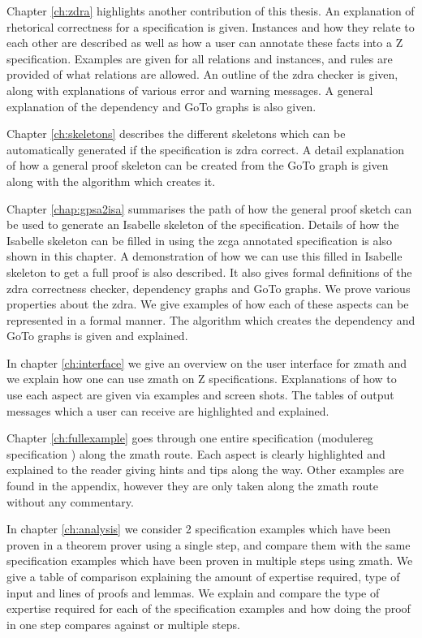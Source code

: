 Chapter \ref{ch:zdra} highlights another contribution of this thesis. An
explanation of rhetorical correctness for a specification is given. Instances
and how they relate to each other are described as well as how a user can
annotate these facts into a Z specification. Examples are given for all
relations and instances, and rules are provided of what relations are allowed.
An outline of the \gls{zdra} checker is given, along with explanations of
various error and warning messages. A general explanation of the dependency and
GoTo graphs is also given.

Chapter \ref{ch:skeletons} describes the different skeletons which can be
automatically generated if the specification is \gls{zdra} correct. A detail
explanation of how a general proof skeleton can be created from the GoTo graph
is given along with the algorithm which creates it. 

Chapter \ref{chap:gpsa2isa} summarises the path of how the general proof sketch
can be used to generate an Isabelle skeleton of the specification. Details of
how the Isabelle skeleton can be filled in using the \gls{zcga} annotated
specification is also shown in this chapter. A demonstration of how we can use
this filled in Isabelle skeleton to get a full proof is also described. It also
gives formal definitions of the \gls{zdra} correctness checker, dependency
graphs and GoTo graphs. We prove various properties about the \gls{zdra}. We
give examples of how each of these aspects can be represented in a formal
manner. The algorithm which creates the dependency and GoTo graphs is given and
explained.

In chapter \ref{ch:interface} we give an overview on the user interface for
\gls{zmath} and we explain how one can use \gls{zmath} on Z specifications.
Explanations of how to use each aspect are given via examples and screen shots.
The tables of output messages which a user can receive are highlighted and
explained.

Chapter \ref{ch:fullexample} goes through one entire specification (modulereg
specification \cite{essenceofz}) along the \gls{zmath} route. Each aspect is
clearly highlighted and explained to the reader giving hints and tips along the
way. Other examples are found in the appendix, however they are only taken along
the \gls{zmath} route without any commentary.

In chapter \ref{ch:analysis} we consider 2 specification examples which have
been proven in a theorem prover using a single step, and compare them with the
same specification examples which have been proven in multiple steps using
\gls{zmath}. We give a table of comparison explaining the amount of expertise
required, type of input and lines of proofs and lemmas. We explain and compare
the type of expertise required for each of the specification examples and how
doing the proof in one step compares against or multiple steps.

